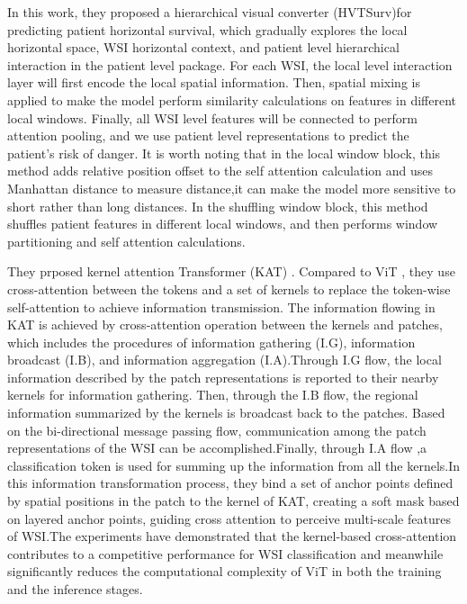 \documentclass[journal,twoside,web]{ieeecolor}
\begin{document}
In this work, they proposed a hierarchical visual converter (HVTSurv)\cite{shao2023hvtsurv}for predicting patient horizontal survival, which gradually explores the local horizontal space, WSI horizontal context, and patient level hierarchical interaction in the patient level package. For each WSI, the local level interaction layer will first encode the local spatial information. Then, spatial mixing is applied to make the model perform similarity calculations on features in different local windows. Finally, all WSI level features will be connected to perform attention pooling, and we use patient level representations to predict the patient's risk of danger. It is worth noting that in the local window block, this method adds relative position offset to the self attention calculation and uses Manhattan distance to measure distance,it can make the model more sensitive to short rather than long distances\cite{wu2021rethinking}. In the shuffling window block, this method shuffles patient features in different local windows, and then performs window partitioning and self attention calculations.


They prposed kernel attention Transformer (KAT)\cite{zheng2023kernel} . Compared to ViT \cite{dosovitskiy2020image}, they use cross-attention between the tokens and a set of kernels to replace the token-wise self-attention to achieve information transmission. The information flowing in KAT is achieved by cross-attention operation between the kernels and patches, which includes the procedures of information gathering (I.G), information broadcast (I.B), and information aggregation (I.A).Through I.G flow, the local information described by the patch representations is reported to their nearby kernels for information gathering. Then, through the I.B flow, the regional information summarized by the kernels is broadcast back to the patches. Based on the bi-directional message passing flow, communication among the patch representations of the WSI can be accomplished.Finally, through I.A flow ,a classification token is used for summing up the information from all the kernels.In this information transformation process, they bind a set of anchor points defined by spatial positions in the patch to the kernel of KAT, creating a soft mask based on layered anchor points, guiding cross attention to perceive multi-scale features of WSI.The experiments have demonstrated that the kernel-based cross-attention contributes to a competitive performance for WSI classification and meanwhile significantly reduces the computational complexity of ViT in both the training and the inference stages.
\end{document}
